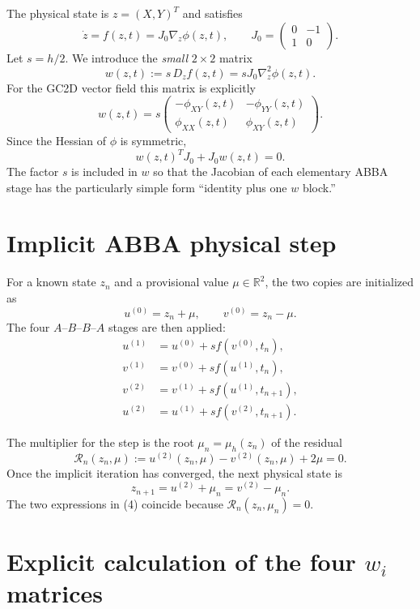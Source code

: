 \documentclass[11pt,a4paper]{article}
\newcommand{\R}{\mathbb{R}}
\begin{document}
The physical state is $z=(X,Y)^T$ and satisfies
\[
 \dot z=f(z,t)=J_0\nabla_z\phi(z,t),
 \qquad
 J_0=
 \begin{pmatrix}
  0&-1\\
  1&0
 \end{pmatrix}.
\]
Let $s=h/2$. We introduce the \emph{small} $2\times2$ matrix
\[
 \boxed{
 w(z,t):=s\,D_zf(z,t)=sJ_0\nabla_z^2\phi(z,t).
 }
\]
For the GC2D vector field this matrix is explicitly
\[
 \boxed{
 w(z,t)=
 s\begin{pmatrix}
  -\phi_{XY}(z,t)&-\phi_{YY}(z,t)\\
  \phi_{XX}(z,t)&\phi_{XY}(z,t)
 \end{pmatrix}.
 }
 \tag{1}
\]
Since the Hessian of $\phi$ is symmetric,
\[
 w(z,t)^TJ_0+J_0w(z,t)=0.
\]
The factor $s$ is included in $w$ so that the Jacobian of each elementary ABBA stage has
the particularly simple form ``identity plus one $w$ block.''

\section{Implicit ABBA physical step}

For a known state $z_n$ and a provisional value $\mu\in\R^2$, the two copies are
initialized as
\[
 u^{(0)}=z_n+\mu,
 \qquad
 v^{(0)}=z_n-\mu.
\]
The four $A$--$B$--$B$--$A$ stages are then applied:
\begin{align}
 u^{(1)}&=u^{(0)}+s f(v^{(0)},t_n), \tag{2a}\\
 v^{(1)}&=v^{(0)}+s f(u^{(1)},t_n), \tag{2b}\\
 v^{(2)}&=v^{(1)}+s f(u^{(1)},t_{n+1}), \tag{2c}\\
 u^{(2)}&=u^{(1)}+s f(v^{(2)},t_{n+1}). \tag{2d}
\end{align}

The multiplier for the step is the root $\mu_n=\mu_h(z_n)$ of the residual
\[
 \boxed{
 \mathcal R_n(z_n,\mu)
 :=u^{(2)}(z_n,\mu)-v^{(2)}(z_n,\mu)+2\mu=0.
 }
 \tag{3}
\]
Once the implicit iteration has converged, the next physical state is
\[
 \boxed{
 z_{n+1}=u^{(2)}+\mu_n=v^{(2)}-\mu_n.
 }
 \tag{4}
\]
The two expressions in (4) coincide because $\mathcal R_n(z_n,\mu_n)=0$.

\section{Explicit calculation of the four \texorpdfstring{$w_i$}{wi} matrices}
\end{document}
